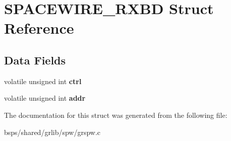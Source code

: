 \hypertarget{structSPACEWIRE__RXBD}{}\section{S\+P\+A\+C\+E\+W\+I\+R\+E\+\_\+\+R\+X\+BD Struct Reference}
\label{structSPACEWIRE__RXBD}
\subsection*{Data Fields}
\begin{DoxyCompactItemize}
\item 
\mbox{\label{structSPACEWIRE__RXBD_a2d66b520ae2d00fc871c51ae1d1084f3}} 
volatile unsigned int {\bfseries ctrl}
\item 
\mbox{\label{structSPACEWIRE__RXBD_af550e95f13476209c7b39e06e2212e40}} 
volatile unsigned int {\bfseries addr}
\end{DoxyCompactItemize}


The documentation for this struct was generated from the following file\+:\begin{DoxyCompactItemize}
\item 
bsps/shared/grlib/spw/grspw.\+c\end{DoxyCompactItemize}
